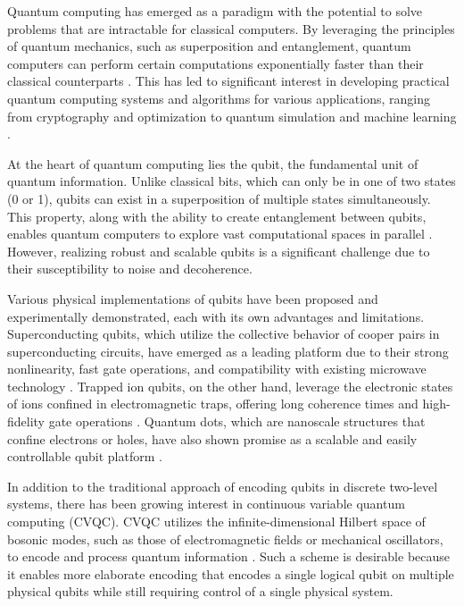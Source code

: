 \documentclass[12pt]{report}
\begin{document}
Quantum computing has emerged as a paradigm with the potential to solve problems that are intractable for classical computers. 
By leveraging the principles of quantum mechanics, such as superposition and entanglement, quantum computers can perform certain computations exponentially faster than their classical counterparts \cite{Nielsen2010}. 
This has led to significant interest in developing practical quantum computing systems and algorithms for various applications, ranging from cryptography and optimization to quantum simulation and machine learning \cite{Preskill2018}.
\par
At the heart of quantum computing lies the qubit, the fundamental unit of quantum information. 
Unlike classical bits, which can only be in one of two states (0 or 1), qubits can exist in a superposition of multiple states simultaneously. 
This property, along with the ability to create entanglement between qubits, enables quantum computers to explore vast computational spaces in parallel \cite{Nielsen2010}. 
However, realizing robust and scalable qubits is a significant challenge due to their susceptibility to noise and decoherence.
\par
Various physical implementations of qubits have been proposed and experimentally demonstrated, each with its own advantages and limitations. 
Superconducting qubits, which utilize the collective behavior of cooper pairs in superconducting circuits, have emerged as a leading platform due to their strong nonlinearity, fast gate operations, and compatibility with existing microwave technology \cite{Kjaergaard2020}. 
Trapped ion qubits, on the other hand, leverage the electronic states of ions confined in electromagnetic traps, offering long coherence times and high-fidelity gate operations \cite{Bruzewicz2019}. 
Quantum dots, which are nanoscale structures that confine electrons or holes, have also shown promise as a scalable and easily controllable qubit platform \cite{Chatterjee2021}.
\par
In addition to the traditional approach of encoding qubits in discrete two-level systems, there has been growing interest in continuous variable quantum computing (CVQC). 
CVQC utilizes the infinite-dimensional Hilbert space of bosonic modes, such as those of electromagnetic fields or mechanical oscillators, to encode and process quantum information \cite{Braunstein2005}. 
Such a scheme is desirable because it enables more elaborate encoding that encodes a single logical qubit on multiple physical qubits while still requiring control of a single physical system.
\end{document}
